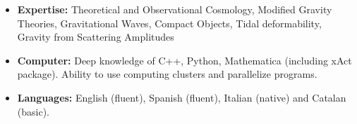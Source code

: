 \begin{itemize}
\item\textbf{\normalsize{Expertise:}} \normalsize{Theoretical and Observational Cosmology, Modified Gravity Theories, Gravitational Waves, Compact Objects, Tidal deformability, Gravity from Scattering Amplitudes}
\item\textbf{\normalsize{Computer:}} \normalsize{Deep knowledge of C++, Python, Mathematica (including xAct package). Ability to use computing clusters and parallelize programs.}
\item\textbf{\normalsize{Languages:}} \normalsize{English (fluent), Spanish (fluent), Italian (native) and Catalan (basic).}
\end{itemize}
\vspace{-15pt}
